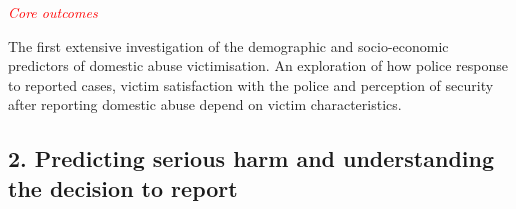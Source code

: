 \documentclass[11pt, a4paper]{article}
\begin{document}








\textcolor{red}{\textit{Core outcomes}} 

The first extensive investigation of the demographic and socio-economic predictors of domestic abuse victimisation. An exploration of how police response to reported cases, victim satisfaction with the police and perception of security after reporting domestic abuse depend on victim characteristics.




\subsection*{2. Predicting serious harm and understanding the decision to report}
\end{document}

